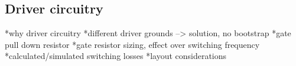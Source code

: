 \subsection{Driver circuitry}  \label{driver}


*why driver circuitry
*different driver grounds --> solution, no bootstrap
*gate pull down resistor
*gate resistor sizing, effect over switching frequency 
*calculated/simulated switching losses
*layout considerations
